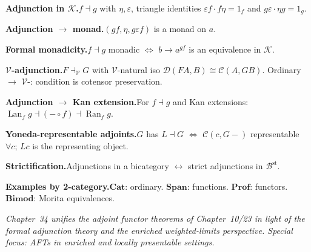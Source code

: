 \begin{formalrestatement}
\textbf{Adjunction in $\mathcal{K}$.}\quad $f \dashv g$ with $\eta, \varepsilon$,
triangle identities $\varepsilon f \cdot f\eta = 1_f$ and $g\varepsilon \cdot
\eta g = 1_g$.

\medskip
\textbf{Adjunction $\to$ monad.}\quad $(gf, \eta, g\varepsilon f)$ is a monad
on $a$.

\medskip
\textbf{Formal monadicity.}\quad $f \dashv g$ monadic $\iff$ $b \to a^{gf}$
is an equivalence in $\mathcal{K}$.

\medskip
\textbf{$\mathcal{V}$-adjunction.}\quad $F \dashv_\mathcal{V} G$ with
$\mathcal{V}$-natural iso $\mathcal{D}(FA, B) \cong \mathcal{C}(A, GB)$.
Ordinary $\to$ $\mathcal{V}$-: condition is cotensor preservation.

\medskip
\textbf{Adjunction $\to$ Kan extension.}\quad For $f \dashv g$ and Kan
extensions: $\operatorname{Lan}_f g \dashv (- \circ f) \dashv \operatorname{Ran}_f g$.

\medskip
\textbf{Yoneda-representable adjoints.}\quad $G$ has $L \dashv G$ $\iff$
$\mathcal{C}(c, G-)$ representable $\forall c$; $L c$ is the representing object.

\medskip
\textbf{Strictification.}\quad Adjunctions in a bicategory $\leftrightarrow$
strict adjunctions in $\mathcal{B}^{\mathrm{st}}$.

\medskip
\textbf{Examples by 2-category.}\quad $\mathbf{Cat}$: ordinary. $\mathbf{Span}$:
functions. $\mathbf{Prof}$: functors. $\mathbf{Bimod}$: Morita equivalences.

\medskip
\noindent\textit{Chapter~34 unifies the adjoint functor theorems of
Chapter~10/23 in light of the formal adjunction theory and the enriched
weighted-limits perspective. Special focus: AFTs in enriched and locally
presentable settings.}
\end{formalrestatement}
